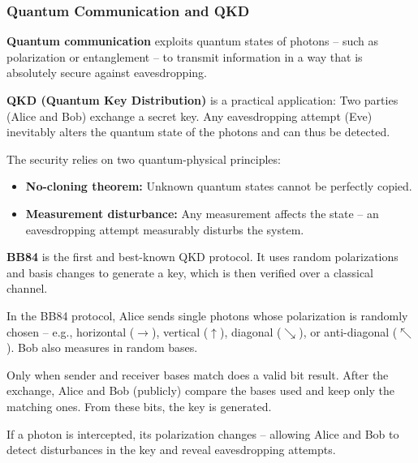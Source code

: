 \subsubsection{Quantum Communication and QKD}

\textbf{Quantum communication} exploits quantum states of photons – such as polarization or entanglement – to transmit information in a way that is absolutely secure against eavesdropping.

\textbf{QKD (Quantum Key Distribution)} is a practical application: Two parties (Alice and Bob) exchange a secret key. Any eavesdropping attempt (Eve) inevitably alters the quantum state of the photons and can thus be detected.
\newpage
\noindent
\begin{tcolorbox}[didaktikbox, title=What Makes QKD Secure?] 
	\label{box:qkd}
	\small
	The security relies on two quantum-physical principles:
	\begin{itemize}
		\item \textbf{No-cloning theorem:} Unknown quantum states cannot be perfectly copied.
		\item \textbf{Measurement disturbance:} Any measurement affects the state – an eavesdropping attempt measurably disturbs the system.
	\end{itemize}
\end{tcolorbox}

\textbf{BB84} is the first and best-known QKD protocol. It uses random polarizations and basis changes to generate a key, which is then verified over a classical channel.

\vspace{1em}
\begin{tcolorbox}[didaktikbox, title={How Does QKD Work (e.g., BB84)?}] 
	\label{box:wie funktioniert QKD}
	\small
	In the BB84 protocol, Alice sends single photons whose polarization is randomly chosen – e.g., horizontal ($\rightarrow$), vertical ($\uparrow$), diagonal ($\searrow$), or anti-diagonal ($\nwarrow$). Bob also measures in random bases.
	
	Only when sender and receiver bases match does a valid bit result. After the exchange, Alice and Bob (publicly) compare the bases used and keep only the matching ones. From these bits, the key is generated.
	
	If a photon is intercepted, its polarization changes – allowing Alice and Bob to detect disturbances in the key and reveal eavesdropping attempts.
\end{tcolorbox}

